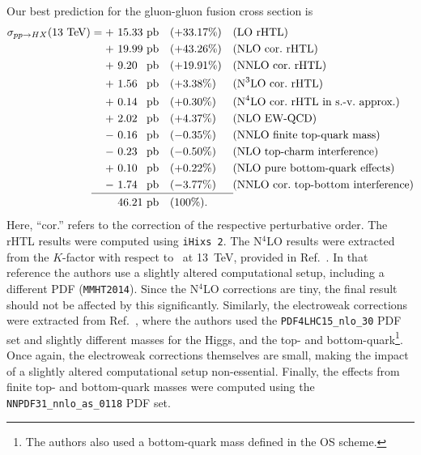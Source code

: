 Our best prediction for the gluon-gluon fusion cross section is
\begin{equation}
\begin{alignedat}{4}
\sigma_{pp \rightarrow HX} (13\ \mathrm{TeV}) = +\ & 15.33 \ &&\mathrm{pb    } && (+33.17\%) \quad  &&(\text{LO rHTL}) \\
+\ & 19.99\ &&\mathrm{pb} \quad && (+43.26\%)  &&(\text{NLO cor.\ rHTL}) \\
+\ & 9.20\ &&\mathrm{pb} \quad && (+19.91\%) &&(\text{NNLO cor.\ rHTL}) \\
+\ & 1.56\ &&\mathrm{pb} \quad && (+3.38\%) &&(\text{N}^3\text{LO cor.\ rHTL}) \\
+\ & 0.14\ &&\mathrm{pb} \quad && (+0.30\%) &&(\text{N}^4 \text{LO cor.\ rHTL in s.-v.\ approx.}) \\
+\ & 2.02\ &&\mathrm{pb} \quad && (+4.37\%) &&(\text{NLO EW-QCD}) \\
-\ & 0.16\ &&\mathrm{pb} \quad && (-0.35\%) &&(\text{NNLO finite top-quark mass}) \\
-\ & 0.23\ &&\mathrm{pb} \quad && (-0.50\%) &&(\text{NLO top-charm interference}) \\
+\ & 0.10 \ &&\mathrm{pb}\quad && (+0.22\%) &&(\text{NLO pure bottom-quark effects}) \\
-\ & 1.74\ &&\mathrm{pb} \quad && (-3.77\%) &&(\text{NNLO cor.\ top-bottom interference}) \\[-10pt]
& &&  \hspace{0.5cm} \mathclap{\rule{4.5cm}{0.4pt}}\\[-4pt]
& 46.21 \ &&\mathrm{pb} && (100\%).
\end{alignedat}
\end{equation}
Here, ``cor.'' refers to the correction of the respective perturbative order. The \acs{rHTL} results were computed using \texttt{iHixs 2}. The N${}^4$LO results were extracted from the $K$-factor with respect to \NNNLO\ at 13~TeV, provided in Ref.~\cite{Das:2020adl}. In that reference the authors use a slightly altered computational setup, including a different \acs{PDF} (\texttt{MMHT2014}). Since the N${}^4$LO corrections are tiny, the final result should not be affected by this significantly. Similarly, the electroweak corrections were extracted from Ref.~\cite{Becchetti:2020wof}, where the authors used the \texttt{PDF4LHC15\_nlo\_30} PDF set and slightly different masses for the Higgs, and the top- and bottom-quark\footnote{The authors also used a bottom-quark mass defined in the \acs{OS} scheme.}. Once again, the electroweak corrections themselves are small, making the impact of a slightly altered computational setup non-essential. Finally, the effects from finite top- and bottom-quark masses were computed using the \texttt{NNPDF31\_nnlo\_as\_0118} PDF set.

